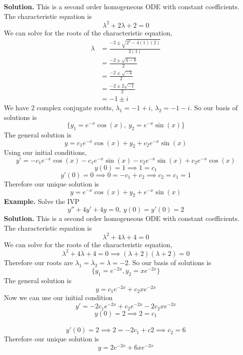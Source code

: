 \documentclass[openany]{report}
\begin{document}
\textbf{Solution.} This is a second order homogeneous ODE with constant coefficients. The characteristic equation is
\[\lambda^2 + 2\lambda + 2 = 0\]
We can solve for the roots of the characteristic equation,
\begin{align*}
    \lambda &= \frac{-2 \pm \sqrt{2^2 - 4(1)(2)}}{2(1)}\\
    &= \frac{-2 \pm \sqrt{4 - 8}}{2}\\
    &= \frac{-2 \pm \sqrt{-4}}{2}\\
    &= \frac{-2 \pm 2\sqrt{-1}}{2}\\
    &= -1 \pm i
\end{align*}
We have 2 complex conjugate rootts, $\lambda_1 = -1 + i$, $\lambda_2 = -1 - i$. So our basis of solutions is
\[\{y_1 = e^{-x}\cos(x), \ y_2 = e^{-x}\sin(x)\}\]
The general solution is 
\[y = c_1e^{-x}\cos(x) + y_2 + c_2e^{-x}\sin(x)\]
Using our initial conditions,
\[y' = -c_1e^{-x}\cos(x) - c_1e^{-x}\sin(x) - c_2e^{-x}\sin(x) + c_2e^{-x}\cos(x)\]
\[y(0) = 1 \implies 1 = c_1\]
\[y'(0) = 0 \implies 0 = -c_1 + c_2 \implies c_2 = c_1 = 1\]
Therefore our unique solution is 
\[y = e^{-x}\cos(x) + y_2 + e^{-x}\sin(x)\]
\textbf{Example.} Solve the IVP
\[y'' + 4y' + 4y = 0, \ y(0) = y'(0) = 2\]
\textbf{Solution.} This is a second order homogeneous ODE with constant coefficients. The characteristic equation is
\[\lambda^2 + 4\lambda + 4 = 0\]
We can solve for the roots of the characteristic equation,
\[\lambda^2 + 4\lambda + 4 = 0 \implies (\lambda + 2)(\lambda +2) = 0\]
Therefore our roots are $\lambda_1 = \lambda_2 = \lambda = -2$. So our basis of solutions is
\[\{y_1 = e^{-2x}, y_2 = xe^{-2x}\}\]
The general solution is
\[y = c_1e^{-2x} + c_2xe^{-2x}\]
Now we can use our initial condition 
\[y' = -2c_1e^{-2x} + c_2e^{-2x}-2c_2xe^{-2x}\]
\[y(0) = 2 \implies 2 = c_1\]\
\[y'(0) = 2 \implies 2 = -2c_1 + c2 \implies c_2 = 6 \]
Therefore our unique solution is
\[y = 2e^{-2x} + 6xe^{-2x}\]
\end{document}
